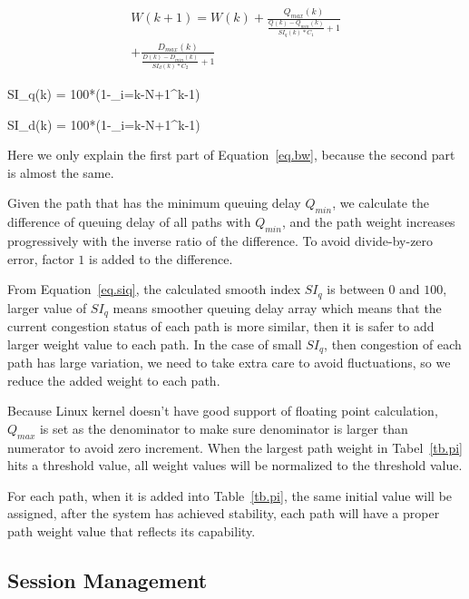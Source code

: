 \begin{eqnarray}
\label{eq.bw}
W(k+1) = W(k) + \frac{Q_{max}(k)}{\frac{Q(k)-Q_{min}(k)}{SI_q(k)*C_1}+1} \nonumber \\
\left.		  + \frac{D_{max}(k)}{\frac{D(k)-D_{min}(k)}{SI_d(k)*C_2}+1}\right. 
\end{eqnarray}

\be
\label{eq.siq}
SI_q(k) = 100*(1-\sum_{i=k-N+1}^{k-1})
\ee

\be
\label{eq.sid}
SI_d(k) = 100*(1-\sum_{i=k-N+1}^{k-1})
\ee

Here we only explain the first part of Equation~\ref{eq.bw}, because the second part is almost the same.

Given the path that has the minimum queuing delay $Q_{min}$, we calculate the difference of queuing delay of all paths with $Q_{min}$, and the path weight increases progressively with the inverse ratio of the difference. To avoid divide-by-zero error, factor $1$ is added to the difference.

From Equation~\ref{eq.siq}, the calculated smooth index $SI_q$ is between $0$ and $100$, larger value of $SI_q$ means smoother queuing delay array which means that the current congestion status of each path is more similar, then it is safer to add larger weight value to each path. In the case of small $SI_q$, then congestion of each path has large variation, we need to take extra care to avoid fluctuations, so we reduce the added weight to each path.

Because Linux kernel doesn\textquoteright t have good support of floating point calculation, $Q_{max}$ is set as the denominator to make sure denominator is larger than numerator to avoid zero increment. When the largest path weight in Tabel~\ref{tb.pi} hits a threshold value, all weight values will be normalized to the threshold value.

For each path, when it is added into Table~\ref{tb.pi}, the same initial value will be assigned, after the system has achieved stability, each path will have a proper path weight value that reflects its capability. 

%


\subsection{Session Management}
\label{sec:session}


